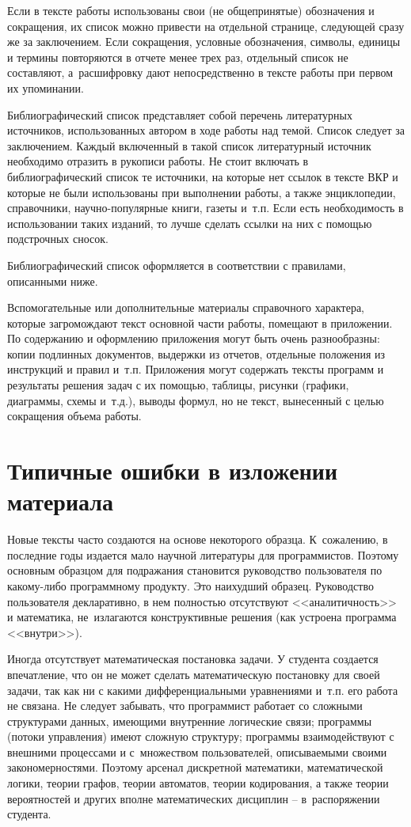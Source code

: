 \documentclass[PI,VKR]{HSEUniversityPractice}
\begin{document}
Если в тексте работы использованы свои (не общепринятые) обозначения и сокращения, их список можно привести на отдельной странице, следующей сразу же за заключением. Если сокращения, условные обозначения, символы, единицы и термины повторяются в отчете менее трех раз, отдельный список не составляют, а расшифровку дают непосредственно в тексте работы при первом их упоминании.

Библиографический список представляет собой перечень литературных источников, использованных автором в ходе работы над темой. Список следует за заключением.
Каждый включенный в такой список литературный источник необходимо отразить в рукописи работы. Не стоит включать в библиографический список те источники, на которые нет ссылок в тексте ВКР и которые не были использованы при выполнении работы, а также энциклопедии, справочники, научно-популярные книги, газеты и т.п. Если есть необходимость в использовании таких изданий, то лучше сделать ссылки на них с помощью подстрочных сносок.

Библиографический список оформляется в соответствии с правилами, описанными ниже.

Вспомогательные или дополнительные материалы справочного характера, которые загромождают текст основной части работы, помещают в приложении.
По содержанию и оформлению приложения могут быть очень разнообразны: копии подлинных документов, выдержки из отчетов, отдельные положения из инструкций и правил и т.п. Приложения могут содержать тексты программ и результаты решения задач с их помощью, таблицы, рисунки (графики, диаграммы, схемы и т.д.), выводы формул, но не текст, вынесенный с целью сокращения объема работы.

\section{Типичные ошибки в изложении материала}

Новые тексты часто создаются на основе некоторого образца. К сожалению, в последние годы издается мало научной литературы для программистов. Поэтому основным образцом для подражания становится руководство пользователя по какому-либо программному продукту. Это наихудший образец. Руководство пользователя декларативно, в нем полностью отсутствуют <<аналитичность>> и математика, не излагаются конструктивные решения (как устроена программа <<внутри>>).

Иногда отсутствует математическая постановка задачи. У студента создается впечатление, что он не может сделать математическую постановку для своей задачи, так как ни с какими дифференциальными уравнениями и т.п. его работа не связана. Не следует забывать, что программист работает со сложными структурами данных, имеющими внутренние логические связи; программы (потоки управления) имеют сложную структуру; программы взаимодействуют с внешними процессами и с множеством пользователей, описываемыми своими закономерностями. Поэтому арсенал дискретной математики, математической логики, теории графов, теории автоматов, теории кодирования, а также теории вероятностей и других вполне математических дисциплин – в распоряжении студента.
\end{document}
